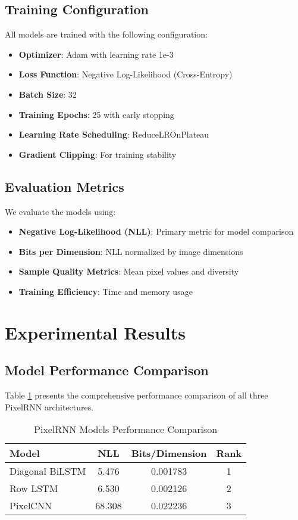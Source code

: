 \documentclass[norunningheads]{llncs}
\begin{document}
\subsection{Training Configuration}

All models are trained with the following configuration:
\begin{itemize}
\item \textbf{Optimizer}: Adam with learning rate 1e-3
\item \textbf{Loss Function}: Negative Log-Likelihood (Cross-Entropy)
\item \textbf{Batch Size}: 32
\item \textbf{Training Epochs}: 25 with early stopping
\item \textbf{Learning Rate Scheduling}: ReduceLROnPlateau
\item \textbf{Gradient Clipping}: For training stability
\end{itemize}

\subsection{Evaluation Metrics}

We evaluate the models using:
\begin{itemize}
\item \textbf{Negative Log-Likelihood (NLL)}: Primary metric for model comparison
\item \textbf{Bits per Dimension}: NLL normalized by image dimensions
\item \textbf{Sample Quality Metrics}: Mean pixel values and diversity
\item \textbf{Training Efficiency}: Time and memory usage
\end{itemize}

\section{Experimental Results}

\subsection{Model Performance Comparison}

Table \ref{tab:model_comparison} presents the comprehensive performance comparison of all three PixelRNN architectures.

\begin{table}[h]
\caption{PixelRNN Models Performance Comparison}
\label{tab:model_comparison}
\centering
\begin{tabular}{@{}lccc@{}}
\toprule
Model & NLL & Bits/Dimension & Rank \\
\midrule
Diagonal BiLSTM & 5.476 & 0.001783 & 1 \\
Row LSTM & 6.530 & 0.002126 & 2 \\
PixelCNN & 68.308 & 0.022236 & 3 \\
\bottomrule
\end{tabular}
\end{table}
\end{document}
